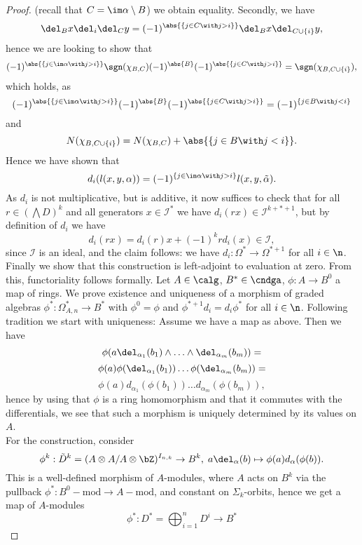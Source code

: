 \begin{prop}
\begin{proof}
(recall that $C = \im \alpha \setminus B$) we obtain equality. Secondly, we have%
    \[\del_B x \del_i \del_C y = (-1)^{ \abs{ \{j \in C \with j > i\} } }%
    \del_B x \del_{ C \cup \{i\} } y, \]
hence we are looking to show that%
    \[ (-1)^{\abs{\{ j \in \im \alpha \with j > i \}} } \sgn(\chi_{B,C})%
    (-1)^{\abs{B}} (-1)^{ \abs{ \{j \in C \with j > i\} } } = %
    \sgn( \chi_{ B, C \cup \{i\} } ), \]
which holds, as%
    \[ (-1)^{\abs{\{ j \in \im \alpha \with j > i \}} } %
    (-1)^{\abs{B}} (-1)^{ \abs{ \{j \in C \with j > i\} } } =%
    (-1)^{ \{ j \in B \with j < i \} } \]%
and%
    \[ N(\chi_{ B, C \cup \{i\} }) = N(\chi_{B,C}) + %
    \abs{ \{j \in B \with j < i\} }. \]
Hence we have shown that%
    \[ d_i ( l(x,y,\alpha) ) = (-1)^{ \{j \in \im \alpha \with j > i \} }%
    l(x,y,\tilde \alpha). \]
As $d_i$ is not multiplicative, but is additive, it now suffices to check that for all $r \in (\bigwedge D)^k$ and all generators $x \in \mathcal{I}^*$ we have $d_i(rx) \in \mathcal{I}^{k+*+1}$, but by definition of $d_i$ we have%
    \[ d_i(rx) = d_i(r) x + (-1)^k r d_i(x) \in \mathcal{I}, \]
since $\mathcal{I}$ is an ideal, and the claim follows: we have $d_i:\Omega^* \to \Omega^{*+1}$ for all $i \in \n$.\\
Finally we show that this construction is left-adjoint to evaluation at zero. From this, functoriality follows formally. Let $A \in \calg$, $B^* \in \cndga$, $\phi: A \to B^0$ a map of rings. We prove existence and uniqueness of a morphism of graded algebras $\phi^*: \Omega^*_{A,n} \to B^*$ with $\phi^0 = \phi$ and $\phi^{*+1} d_i = d_i \phi^*$ for all $i \in \n$. Following tradition we start with uniqueness: Assume we have a map as above. Then we have
    \[ \phi(a \del_{\alpha_1} (b_1) \wedge \ldots \wedge \del_{\alpha_m} (b_m)) = \]
    \[ \phi(a) \phi (\del_{\alpha_1} (b_1)) \ldots \phi(\del_{\alpha_m} (b_m)) = \]
    \[ \phi(a) d_{\alpha_1} (\phi(b_1)) \ldots d_{\alpha_m} (\phi(b_m)), \]
hence by using that $\phi$ is a ring homomorphism and that it commutes with the differentials, we see that such a morphism is uniquely determined by its values on $A$.\\ For the construction, consider%
    \[ \phi^k: \tilde D^k = (A \otimes A / A \otimes \bZ)^{I_{n,k}} %
    \to B^k, \; a \del_\alpha (b) \mapsto %
    \phi(a) d_\alpha (\phi(b)). \]
This is a well-defined morphism of $A$-modules, where $A$ acts on $B^k$ via the pullback $\phi^*:B^0-\mathrm{mod} \to A-\mathrm{mod}$, and constant on $\Sigma_k$-orbits, hence we get a map of $A$-modules%
    \[ \phi^*: D^* = \bigoplus_{i=1}^n D^i \to B^* \]

\end{proof}
\end{prop}
